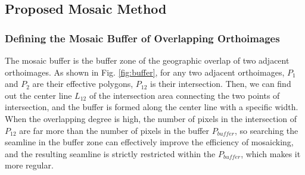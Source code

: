 \documentclass[journal]{IEEEtran}
\begin{document}
\subsection{Proposed Mosaic Method}
\subsubsection{Defining the Mosaic Buffer of Overlapping Orthoimages}
The mosaic buffer is the buffer zone of the geographic overlap of two adjacent orthoimages. As shown in Fig. \ref{fig:buffer}, for any two adjacent orthoimages, $P_1$ and $P_2$ are their effective polygons, $P_{12}$ is their intersection. Then, we can find out the center line $L_{12}$ of the intersection area connecting the two points of intersection, and the buffer is formed along the center line with a specific width. When the overlapping degree is high, the number of pixels in the intersection of $P_{12}$ are far more than the number of pixels in the buffer $P_{buffer}$, so searching the seamline in the buffer zone can effectively improve the efficiency of mosaicking, and the resulting seamline is strictly restricted within the $P_{buffer}$, which makes it more regular.
\end{document}
